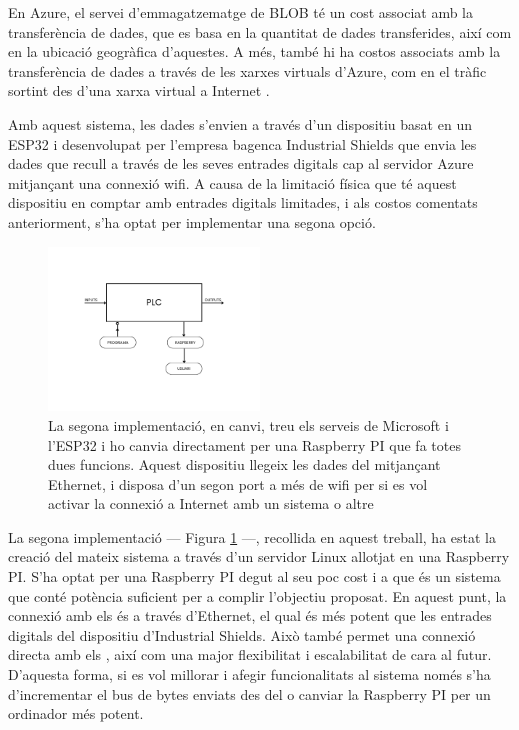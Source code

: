 \documentclass{tfgitic}[2022/06/30]
\begin{document}
En Azure, el servei d'emmagatzematge de BLOB té un cost associat amb la transferència
de dades, que es basa en la quantitat de dades transferides, així com en la ubicació geogràfica
d'aquestes. A més, també hi ha costos associats amb la transferència de dades a través de les
xarxes virtuals d'Azure, com en el tràfic sortint des d'una xarxa virtual a Internet \cite{azure:bandwidth-pricing}.

Amb aquest sistema, les dades s'envien a través d'un dispositiu basat en un ESP32 i desenvolupat per l'empresa bagenca Industrial Shields que envia les dades que recull a través de
les seves entrades digitals cap al servidor Azure mitjançant una connexió wifi.
A causa de la limitació física que té aquest dispositiu en comptar amb entrades digitals limitades,
i als costos comentats anteriorment, s'ha optat per implementar una segona opció.

\begin{figure}[h]
\centering
\includegraphics[width=0.5\textwidth]{img/diagramRaspberry.png}
\caption{La segona implementació, en canvi, treu els serveis de Microsoft i l'ESP32 i ho canvia directament per una Raspberry PI que fa totes dues funcions. Aquest dispositiu llegeix les dades del  mitjançant Ethernet, i disposa d'un segon port a més de wifi per si es vol activar la connexió a Internet amb un sistema o altre}
\label{diagramRaspberry}
\end{figure}

La segona implementació --- Figura \ref{diagramRaspberry} ---, recollida en aquest treball, ha estat la creació del mateix sistema a través d'un servidor Linux allotjat en una Raspberry PI. S'ha optat per una Raspberry PI degut al seu poc cost i a que és un sistema que conté potència suficient per a complir l'objectiu proposat. En aquest punt, la connexió amb els  és a través d'Ethernet, el qual és més potent que les entrades digitals del dispositiu d'Industrial Shields. Això també permet una connexió directa amb els , així com una major flexibilitat i escalabilitat de cara al futur. D'aquesta forma, si es vol millorar i afegir funcionalitats al sistema només s'ha d'incrementar el bus de bytes enviats des del  o canviar la Raspberry PI per un ordinador més potent.
\end{document}
